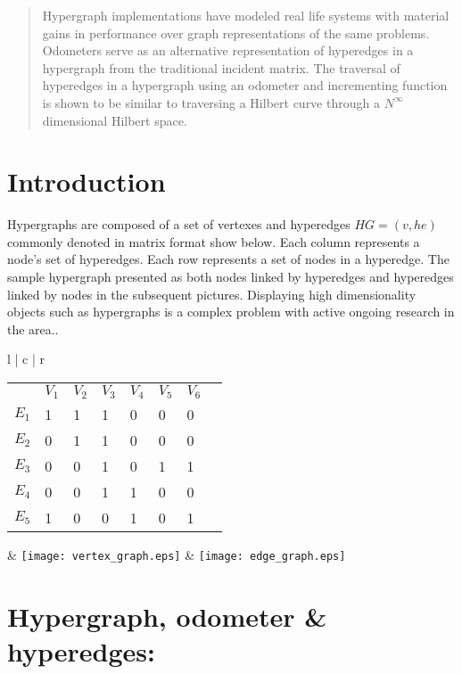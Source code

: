 


\begin{abstract}
Hypergraph implementations have modeled real life systems with material gains in performance over graph representations of the same problems. Odometers serve as an alternative representation of hyperedges in a hypergraph from the traditional incident matrix. The traversal of hyperedges in a hypergraph using an odometer and incrementing function is shown to be similar to traversing a Hilbert curve through a $N^\infty$ dimensional Hilbert space.
\end{abstract}

\section{Introduction}
Hypergraphs are composed of a set of vertexes and hyperedges $HG = (v, he)$ commonly denoted in matrix format show below. Each column represents a node’s set of hyperedges. Each row represents a set of nodes in a hyperedge. The sample hypergraph presented as both nodes linked by hyperedges and hyperedges linked by nodes in the subsequent pictures. Displaying high dimensionality objects such as hypergraphs is a complex problem with active ongoing research in the area..
\begin{center}
\begin{tabular}{l | c | r}

\begin{tabular}{l l l l l l l l}
			 & $V_1$ & $V_2$ & $V_3$ & $V_4$ & $V_5$ & $V_6$ \\
$E_1$  &     1 		& 1          & 1 			& 0 			& 0 			& 0 		 \\
$E_2$  &     0 		& 1          & 1 			& 0 			& 0 			& 0 		 \\
$E_3$  &     0 		& 0          & 1 			& 0 			& 1 			& 1 		 \\
$E_4$  &     0 		& 0          & 1 			& 1			& 0 			& 0 		 \\
$E_5$  &     1 		& 0          & 0 			& 1			& 0 			& 1 		 \\
\end{tabular}

& \texttt{[image: vertex\_graph.eps]} & \texttt{[image: edge\_graph.eps]}\
\end{tabular}
\end{center}


\newpage

\section{Hypergraph, odometer \& hyperedges:}

